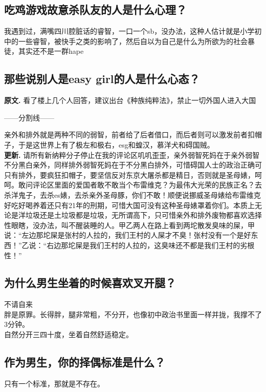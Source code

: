 \documentclass{ctexart}
\begin{document}
		\subsection{吃鸡游戏故意杀队友的人是什么心理？}
			我遇到过，满嘴四川腔脏话的睿智，一口一个sb，没办法，这种人估计就是小学初中的一些睿智，被快手之类的影响了，然后自以为自己是什么为所欲为的社会暴徒，其实还不是一群hape

		\subsection{那些说别人是easy girl的人是什么心态？}
			\textbf{原文.}
			看了楼上几个人回答，建议出台《种族纯粹法》，禁止一切外国人进入大国

			\noindent ——分割线——

			\noindent 亲外和排外就是两种不同的弱智，前者给了后者借口，而后者则可以激发前者扣帽子，于是这世界上有了极左和极右，esg和蝗汉，慕洋犬和碍国贼。\\

			\textbf{更新.}
			请所有新纳粹分子停止在我的评论区叽叽歪歪，亲外弱智死妈在于亲外弱智不分黑白亲外，同样排外弱智死妈在于不分黑白排外，可惜碍国人士的政治正确可只有排外，要疯狂扣帽子，要坚信反对东京大屠杀都是精日，否则就是圣母婊，呵呵。敢问评论区里面的爱国者敢不敢当个布雷维克？为最伟大光荣的民族正名？去杀洋鬼子，去杀es婊，去杀亲外圣母豚，你们不敢！顺便说挪威圣母婊给布雷维克好吃好喝养着还只有21年的刑期，可惜大国可没有这种圣母婊罩着你们。本质上无论是洋垃圾还是土垃圾都是垃圾，无所谓高下，只可惜亲外和排外废物都喜欢选择性眼瞎，没办法，叫不醒装睡的人。甲乙两人在路上看到两坨散发臭味的屎，甲说：“左边那坨屎是张村的人拉的，我们王村的人屎才不臭！张村没有一个是好东西！”乙说：“右边那坨屎是我们王村的人拉的，这臭味还不都是我们王村的劣根性！”

		\subsection{为什么男生坐着的时候喜欢叉开腿？}
			\noindent 不请自来 \\

			\noindent 胖是原罪。长得胖，腿非常粗，不分开，也像初中政治书里面一样并拢，我撑不了3分钟。\\

			\noindent 自然分开三四十度，坐着自然舒适稳定。

		\subsection{作为男生，你的择偶标准是什么？}
			只有一个标准，那就是不存在。
\end{document}
